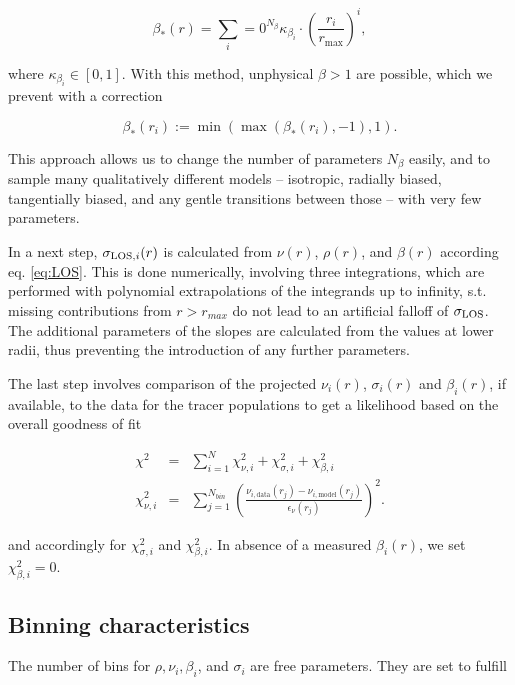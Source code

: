 \begin{equation*}
    \beta_*(r) = \sum_i=0^{N_\beta} \kappa_{\beta_i}\cdot\left(\frac{r_i}{r_{\text{max}}}\right)^i,
\end{equation*}

where $\kappa_{\beta_i}\in [0,1]$. With this method, unphysical
$\beta>1$ are possible, which we prevent with a correction

\begin{equation*}
    \beta_*(r_i) := \min(\max(\beta_*(r_i), -1),1).
\end{equation*}

This approach allows us to change the number of parameters $N_\beta$
easily, and to sample many qualitatively different models --
isotropic, radially biased, tangentially biased, and any gentle
transitions between those -- with very few parameters.

In a next step, $\sigma_{\text{LOS},i}(r)$ is calculated from $\nu(r)$, $\rho(r)$,
and $\beta(r)$ according eq. \ref{eq:LOS}. This is done numerically,
involving three integrations, which are performed with polynomial
extrapolations of the integrands up to infinity, s.t. missing
contributions from $r>r_{max}$ do not lead to an artificial falloff of
$\sigma_{\text{LOS}}$. The additional parameters of the slopes are calculated from
the values at lower radii, thus preventing the introduction of any
further parameters.

The last step involves comparison of the projected $\nu_i(r)$,
$\sigma_i(r)$ and $\beta_i(r)$, if available, to the data for the
tracer populations to get a likelihood based on the overall
goodness of fit

\begin{eqnarray}
\chi^2 &=& \sum_{i=1}^N \chi_{\nu,i}^2 + \chi_{\sigma,i}^2 + \chi_{\beta,i}^2\\
\chi_{\nu,i}^2 &=& \sum_{j=1}^{N_{bin}} \left(\frac{\nu_{i,\text{data}}(r_j)-\nu_{i,\text{model}}(r_j)}{\epsilon_\nu(r_j)}\right)^2.
\end{eqnarray}

and accordingly for $\chi_{\sigma,i}^2$ and $\chi_{\beta,i}^2$. In
absence of a measured $\beta_i(r)$, we set $\chi_{\beta,i}^2=0$.

\subsection{Binning characteristics}

The number of bins for $\rho, \nu_i, \beta_i$, and $\sigma_i$ are free
parameters. They are set to fulfill

